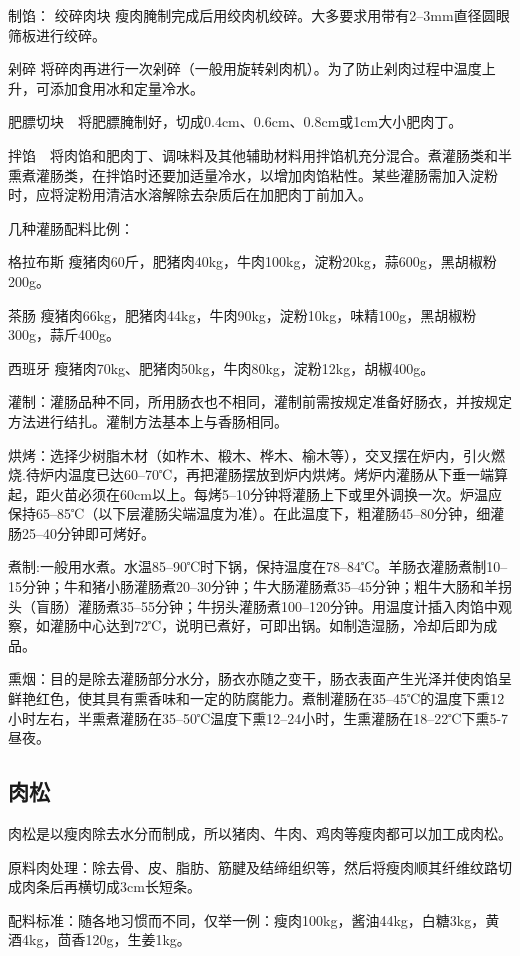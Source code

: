 \documentclass{ctexbook}
\begin{document}
制馅：
绞碎肉块 瘦肉腌制完成后用绞肉机绞碎。大多要求用带有2--3mm直径圆眼筛板进行绞碎。

剁碎 将碎肉再进行一次剁碎（一般用旋转剁肉机）。为了防止剁肉过程中温度上升，可添加食用冰和定量冷水。

肥膘切块　将肥膘腌制好，切成0.4cm、0.6cm、0.8cm或1cm大小肥肉丁。

拌馅　将肉馅和肥肉丁、调味料及其他辅助材料用拌馅机充分混合。煮灌肠类和半熏煮灌肠类，在拌馅时还要加适量冷水，以增加肉馅粘性。某些灌肠需加入淀粉时，应将淀粉用清洁水溶解除去杂质后在加肥肉丁前加入。

几种灌肠配料比例：

格拉布斯 瘦猪肉60斤，肥猪肉40kg，牛肉100kg，淀粉20kg，蒜600g，黑胡椒粉200g。

茶肠 瘦猪肉66kg，肥猪肉44kg，牛肉90kg，淀粉10kg，味精100g，黑胡椒粉300g，蒜斤400g。

西班牙 瘦猪肉70kg、肥猪肉50kg，牛肉80kg，淀粉12kg，胡椒400g。

灌制：灌肠品种不同，所用肠衣也不相同，灌制前需按规定准备好肠衣，并按规定方法进行结扎。灌制方法基本上与香肠相同。

烘烤：选择少树脂木材（如柞木、椴木、桦木、榆木等），交叉摆在炉内，引火燃烧.待炉内温度已达60--70℃，再把灌肠摆放到炉内烘烤。烤炉内灌肠从下垂一端算起，距火苗必须在60cm以上。每烤5--10分钟将灌肠上下或里外调换一次。炉温应保持65--85℃（以下层灌肠尖端温度为准）。在此温度下，粗灌肠45--80分钟，细灌肠25--40分钟即可烤好。

煮制:一般用水煮。水温85--90℃时下锅，保持温度在78--84℃。羊肠衣灌肠煮制10--15分钟；牛和猪小肠灌肠煮20--30分钟；牛大肠灌肠煮35--45分钟；粗牛大肠和羊拐头（盲肠）灌肠煮35--55分钟；牛拐头灌肠煮100--120分钟。用温度计插入肉馅中观察，如灌肠中心达到72℃，说明已煮好，可即出锅。如制造湿肠，冷却后即为成品。

熏烟：目的是除去灌肠部分水分，肠衣亦随之变干，肠衣表面产生光泽并使肉馅呈鲜艳红色，使其具有熏香味和一定的防腐能力。煮制灌肠在35--45℃的温度下熏12小时左右，半熏煮灌肠在35--50℃温度下熏12--24小时，生熏灌肠在18--22℃下熏5-7昼夜。
\subsection{肉松}
肉松是以瘦肉除去水分而制成，所以猪肉、牛肉、鸡肉等瘦肉都可以加工成肉松。

原料肉处理：除去骨、皮、脂肪、筋腱及结缔组织等，然后将瘦肉顺其纤维纹路切成肉条后再横切成3cm长短条。

配料标准：随各地习惯而不同，仅举一例：瘦肉100kg，酱油44kg，白糖3kg，黄酒4kg，茴香120g，生姜1kg。
\end{document}
